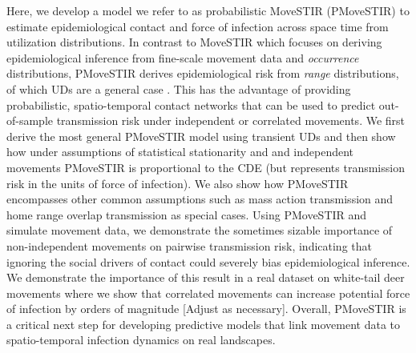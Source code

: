 \documentclass[letterpaper]{article}
\begin{document}
Here, we develop a model we refer to as probabilistic MoveSTIR (PMoveSTIR) to estimate epidemiological contact and force of infection across space time from utilization distributions. In contrast to MoveSTIR which focuses on deriving epidemiological inference from fine-scale movement data and \emph{occurrence} distributions, PMoveSTIR derives epidemiological risk from \emph{range} distributions, of which UDs are a general case \citep{Alston2022}.  This has the advantage of providing probabilistic, spatio-temporal contact networks that can be used to predict out-of-sample transmission risk under independent or correlated movements. We first derive the most general PMoveSTIR model using transient UDs and then show how under assumptions of statistical stationarity and and independent movements PMoveSTIR is proportional to the CDE (but represents transmission risk in the units of force of infection). We also show how PMoveSTIR encompasses other common assumptions such as mass action transmission and home range overlap transmission as special cases.  Using PMoveSTIR and simulate movement data, we demonstrate the sometimes sizable importance of non-independent movements on pairwise transmission risk, indicating that ignoring the social drivers of contact could severely bias epidemiological inference.  We demonstrate the importance of this result in a real dataset on white-tail deer movements where we show that correlated movements can increase potential force of infection by orders of magnitude [Adjust as necessary].  Overall, PMoveSTIR is a critical next step for developing predictive models that link movement data to spatio-temporal infection dynamics on real landscapes.
\end{document}
